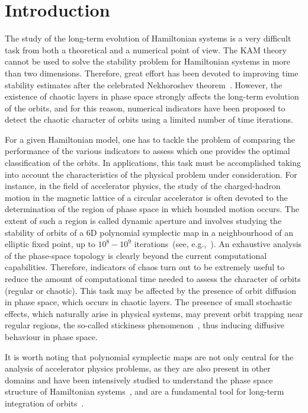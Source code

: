 \section{\label{sec:dyn:intro}Introduction}
%
The study of the long-term evolution of Hamiltonian systems is a very difficult task from both a theoretical and a numerical point of view. The KAM theory~\cite{KAM4} cannot be used to solve the stability problem for Hamiltonian systems in more than two dimensions. Therefore, great effort has been devoted to improving time stability estimates after the celebrated Nekhoroshev theorem~\cite{Nekhoroshev:1977aa}. However, the existence of chaotic layers in phase space strongly affects the long-term evolution of the orbits, and for this reason, numerical indicators have been proposed to detect the chaotic character of orbits using a limited number of time iterations. 

For a given Hamiltonian model, one has to tackle the problem of comparing the performance of the various indicators to assess which one provides the optimal classification of the orbits. In applications, this task must be accomplished taking into account the characteristics of the physical problem under consideration. For instance, in the field of accelerator physics, the study of the charged-hadron motion in the magnetic lattice of a circular accelerator is often devoted to the determination of the region of phase space in which bounded motion occurs. The extent of such a region is called dynamic aperture and involves studying the stability of orbits of a 6D polynomial symplectic map in a neighbourhood of an elliptic fixed point, up to $10^8-10^9$ iterations~(see, e.g.,~\cite{Bazzani:262179}). An exhaustive analysis of the phase-space topology is clearly beyond the current computational capabilities. Therefore, indicators of chaos turn out to be extremely useful to reduce the amount of computational time needed to assess the character of orbits (regular or chaotic). This task may be affected by the presence of orbit diffusion in phase space, which occurs in chaotic layers. The presence of small stochastic effects, which naturally arise in physical systems, may prevent orbit trapping near regular regions, the so-called stickiness phenomenon~\cite{Kandrup1999DiffusionAS,SZEZECH2005394}, thus inducing diffusive behaviour in phase space. 

It is worth noting that polynomial symplectic maps are not only central for the analysis of accelerator physics problems, as they are also present in other domains and have been intensively studied to understand the phase space structure of Hamiltonian systems~\cite{Turaev2003}, and are a fundamental tool for long-term integration of orbits~\cite{Bazzani:262179}. 

